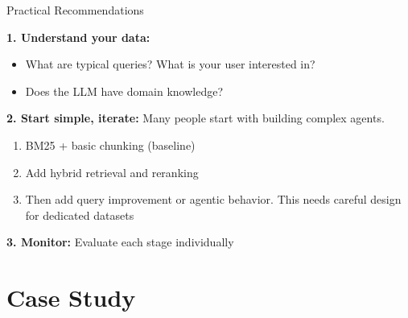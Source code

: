 \documentclass[11pt,compress,t,notes=noshow, xcolor=table]{beamer}
\begin{document}

\begin{frame}{Practical Recommendations}

\vfill

\textbf{1. Understand your data:}
\begin{itemize}
    \item What are typical queries? What is your user interested in?
    \item Does the LLM have domain knowledge?
\end{itemize}

\vspace{1em}

\textbf{2. Start simple, iterate:} Many people start with building complex agents.
\begin{enumerate}
    \item BM25 + basic chunking (baseline)
    \item Add hybrid retrieval and reranking
    \item Then add query improvement or agentic behavior. This needs careful design for dedicated datasets
\end{enumerate}

\vspace{1em}

\textbf{3. Monitor:} Evaluate each stage individually

\vfill

\end{frame}



\section{Case Study}
\end{document}
